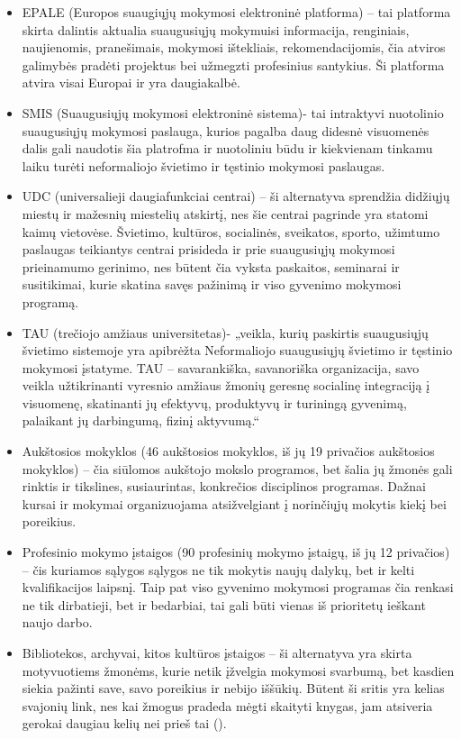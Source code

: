 \documentclass[12pt,a4paper, titlepage]{article}
\begin{document}
\begin{itemize}

\item EPALE (Europos suaugiųjų mokymosi elektroninė platforma) – tai platforma skirta dalintis aktualia suaugusiųjų mokymuisi informacija, renginiais,  naujienomis, pranešimais, mokymosi ištekliais, rekomendacijomis, čia atviros galimybės pradėti projektus bei užmegzti profesinius santykius. Ši platforma atvira visai Europai ir yra daugiakalbė. 
\item SMIS (Suaugusiųjų mokymosi elektroninė sistema)- tai intraktyvi nuotolinio suaugusiųjų mokymosi paslauga, kurios pagalba daug didesnė visuomenės dalis gali naudotis šia platrofma ir nuotoliniu būdu ir kiekvienam tinkamu laiku turėti neformaliojo švietimo ir tęstinio mokymosi paslaugas. 
\item UDC (universalieji daugiafunkciai centrai) – ši alternatyva sprendžia didžiųjų miestų ir mažesnių miestelių atskirtį, nes šie centrai pagrinde yra statomi kaimų vietovėse. Švietimo, kultūros, socialinės, sveikatos, sporto, užimtumo paslaugas teikiantys centrai prisideda ir prie suaugusiųjų mokymosi prieinamumo gerinimo, nes būtent čia vyksta paskaitos, seminarai ir susitikimai, kurie skatina savęs pažinimą ir viso gyvenimo mokymosi programą. 
\item TAU (trečiojo amžiaus universitetas)- „veikla, kurių paskirtis suaugusiųjų švietimo sistemoje yra apibrėžta Neformaliojo suaugusiųjų švietimo ir tęstinio mokymosi įstatyme. TAU – savarankiška, savanoriška organizacija, savo veikla užtikrinanti vyresnio amžiaus žmonių geresnę socialinę integraciją į visuomenę, skatinanti jų efektyvų, produktyvų ir turiningą gyvenimą, palaikant jų darbingumą, fizinį aktyvumą.“
\item Aukštosios mokyklos (46 aukštosios mokyklos, iš jų 19 privačios aukštosios mokyklos) – čia siūlomos aukštojo mokslo programos, bet šalia jų žmonės gali rinktis ir tikslines, susiaurintas, konkrečios disciplinos programas. Dažnai kursai ir mokymai organizuojama atsižvelgiant į norinčiųjų mokytis kiekį bei poreikius. 
\item Profesinio mokymo įstaigos (90 profesinių mokymo įstaigų, iš jų 12 privačios) – čis kuriamos sąlygos sąlygos ne tik mokytis naujų dalykų, bet ir kelti kvalifikacijos laipsnį. Taip pat viso gyvenimo mokymosi programas čia renkasi ne tik dirbatieji, bet ir bedarbiai, tai gali būti vienas iš prioritetų ieškant naujo darbo. 
\item Bibliotekos, archyvai, kitos kultūros įstaigos – ši alternatyva yra skirta motyvuotiems žmonėms, kurie netik įžvelgia mokymosi svarbumą, bet kasdien siekia pažinti save, savo poreikius ir nebijo iššūkių. Būtent ši sritis yra kelias svajonių link, nes kai žmogus pradeda mėgti skaityti knygas, jam atsiveria gerokai daugiau kelių nei prieš tai (\cite{Zablacke2015}).
\end{itemize}
\end{document}
